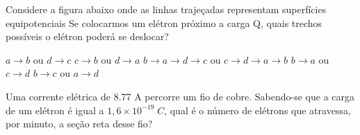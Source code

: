 \documentclass[12pt, addpoints]{exam}
\begin{document}
    \begin{questions}
\begin{multicols*}{2}
\question Considere a figura abaixo onde as linhas trajeçadas representam superfícies equipotenciais Se colocarmos um elétron próximo a carga Q, quais trechos possíveis o elétron poderá se deslocar?
        
        \begin{center}
            \begin{minipage}[c]{0.5\linewidth}
            \end{minipage}
        \end{center}
        
        

\begin{choices}
\choice $a\rightarrow b$ ou $d\rightarrow c$ 
\choice $c\rightarrow b$ ou $d\rightarrow a$ 
\choice $b\rightarrow a\rightarrow d\rightarrow c$ ou $c\rightarrow d\rightarrow a\rightarrow b$ 
\choice $b\rightarrow a$ ou $c\rightarrow d$ 
\choice $b\rightarrow c$ ou $a\rightarrow d$ 
\end{choices}
\question Uma corrente elétrica de    8.77 A percorre um ﬁo de cobre. Sabendo-se que a carga de um elétron é igual a $1,6\times 10^{-19}\;C$, qual é o número de elétrons que atravessa, por minuto, a seção reta desse ﬁo?


\end{multicols*}
\end{questions}
\end{document}
